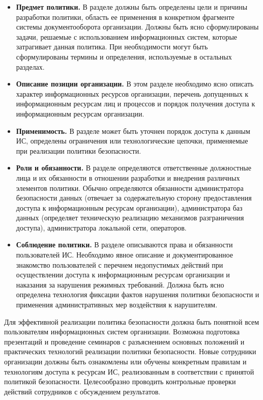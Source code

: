 \begin{itemize}
	\item \textbf{Предмет политики.}
        В разделе должны быть определены цели и причины разработки политики, область ее применения
        в конкретном фрагменте системы документооборота организации. Должны быть ясно сформулированы
        задачи, решаемые с использованием информационных систем, которые затрагивает данная политика.
        При необходимости могут быть сформулированы термины и определения, используемые в остальных разделах.

    \item \textbf{Описание позиции организации.}
        В этом разделе необходимо ясно описать характер информационных ресурсов организации, перечень
        допущенных к информационным ресурсам лиц и процессов и порядок получения доступа к информационным
        ресурсам организации.

    \item \textbf{Применимость.}
        В разделе может быть уточнен порядок доступа к данным ИС, определены ограничения или технологические
        цепочки, применяемые при реализации политики безопасности.

    \item \textbf{Роли и обязанности.}
        В разделе определяются ответственные должностные лица и их обязанности в отношении разработки и
        внедрения различных элементов политики. Обычно определяются обязанности администратора безопасности
        данных (отвечает за содержательную сторону предоставления доступа к информационным ресурсам организации),
        администратора баз данных (определяет техническую реализацию механизмов разграничения доступа),
        администратора локальной сети, операторов.

    \item \textbf{Соблюдение политики.}
        В разделе описываются права и обязанности пользователей ИС. Необходимо явное описание и документированное
        знакомство пользователей с перечнем недопустимых действий при осуществлении доступа к информационным ресурсам
        организации и наказания за нарушения режимных требований. Должна быть ясно определена технология фиксации
        фактов нарушения политики безопасности и применения административных мер воздействия к нарушителям.
\end{itemize}

Для эффективной реализации политика безопасности должна быть понятной всем пользователям информационных
систем организации. Возможна подготовка презентаций и проведение семинаров с разъяснением основных положений
и практических технологий реализации политики безопасности. Новые сотрудники организации должны быть ознакомлены
или обучены конкретным правилам и технологиям доступа к ресурсам ИС, реализованным в соответствии с принятой
политикой безопасности. Целесообразно проводить контрольные проверки действий сотрудников с обсуждением результатов.

